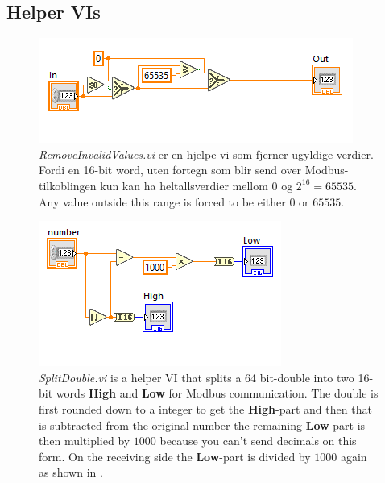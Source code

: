 \subsection{Helper VIs}
\begin{figure}[H]
    \centering
    \includegraphics[width=0.5\linewidth]{vis/Remove invalid values.PNG}
    \caption{\textit{RemoveInvalidValues.vi} er en hjelpe \Gls{vi} som fjerner ugyldige verdier. Fordi en 16-bit \gls{word}, uten fortegn som blir send over Modbus-tilkoblingen kun kan ha heltallsverdier mellom $0$ og $2^{16} = 65535$. Any value outside this range is forced to be either $0$ or $65535$.}
    \label{fig:RIV}
\end{figure}
\begin{figure}[H]
    \centering
    \includegraphics[width=0.5\linewidth]{vis/SplitDouble.PNG}
    \caption{\textit{SplitDouble.vi} is a helper VI that splits a 64 bit-double into two 16-bit words \textbf{High} and \textbf{Low} for Modbus communication. The double is first rounded down to a integer to get the \textbf{High}-part and then that is subtracted from the original number the remaining \textbf{Low}-part is then multiplied by $1000$ because you can't send decimals on this form. On the receiving side the \textbf{Low}-part is divided by $1000$ again as shown in .}
    \label{fig:SplitDouble}
\end{figure}

